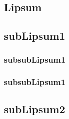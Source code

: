 \documentclass[a4paper, 8pt, landscape]{cheatJTS}
\begin{document}
\begin{cheatsheet}



        \section{Lipsum}
        \subsection{subLipsum1}
            \lipsum[1-5]
        \subsubsection{subsubLipsum1}
            \lipsum[1-5]
        \subsubsection{subsubLipsum1}
            \lipsum[1-5]
        \subsection{subLipsum2}
            \lipsum[1-5]
            
    \end{cheatsheet}
\end{document}

